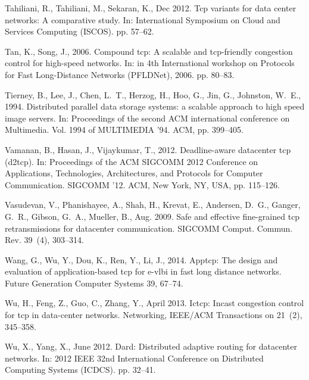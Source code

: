 \documentclass[preprint,3p,times,twocolumn,authoryear]{elsarticle}
\begin{document}
\begin{thebibliography}{46}
Tahiliani, R., Tahiliani, M., Sekaran, K., Dec 2012. Tcp variants for data
  center networks: A comparative study. In: International Symposium on Cloud
  and Services Computing (ISCOS). pp. 57--62.

Tan, K., Song, J., 2006. Compound tcp: A scalable and tcp-friendly congestion
  control for high-speed networks. In: in 4th International workshop on
  Protocols for Fast Long-Distance Networks (PFLDNet), 2006. pp. 80--83.

Tierney, B., Lee, J., Chen, L.~T., Herzog, H., Hoo, G., Jin, G., Johnston,
  W.~E., 1994. Distributed parallel data storage systems: a scalable approach
  to high speed image servers. In: Proceedings of the second ACM international
  conference on Multimedia. Vol. 1994 of MULTIMEDIA '94. ACM, pp. 399--405.

Vamanan, B., Hasan, J., Vijaykumar, T., 2012. Deadline-aware datacenter tcp
  (d2tcp). In: Proceedings of the ACM SIGCOMM 2012 Conference on Applications,
  Technologies, Architectures, and Protocols for Computer Communication.
  SIGCOMM '12. ACM, New York, NY, USA, pp. 115--126.

Vasudevan, V., Phanishayee, A., Shah, H., Krevat, E., Andersen, D.~G., Ganger,
  G.~R., Gibson, G.~A., Mueller, B., Aug. 2009. Safe and effective fine-grained
  tcp retransmissions for datacenter communication. SIGCOMM Comput. Commun.
  Rev. 39~(4), 303--314.

Wang, G., Wu, Y., Dou, K., Ren, Y., Li, J., 2014. Apptcp: The design and
  evaluation of application-based tcp for e-vlbi in fast long distance
  networks. Future Generation Computer Systems 39, 67--74.

Wu, H., Feng, Z., Guo, C., Zhang, Y., April 2013. Ictcp: Incast congestion
  control for tcp in data-center networks. Networking, IEEE/ACM Transactions on
  21~(2), 345--358.

Wu, X., Yang, X., June 2012. Dard: Distributed adaptive routing for datacenter
  networks. In: 2012 IEEE 32nd International Conference on Distributed
  Computing Systems (ICDCS). pp. 32--41.


\end{thebibliography}
\end{document}
